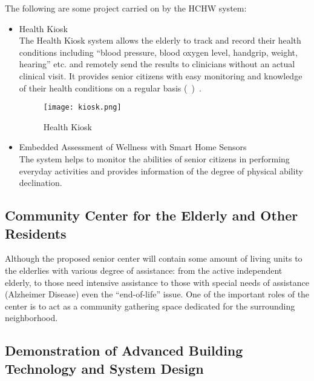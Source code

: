 The following are some project carried on by the HCHW system:
\begin{itemize}
\item Health Kiosk\\
  The Health Kiosk system allows the elderly to track and record their
  health conditions including ``blood pressure, blood oxygen level,
  handgrip, weight, hearing'' etc. and remotely send the results to
  clinicians without an actual clinical visit. It provides senior
  citizens with easy monitoring and knowledge of their health
  conditions on a regular basis (~)~\cite{Kiosk}.
 \begin{figure}[htbp]
   \centering
   \texttt{[image: kiosk.png]}
   \caption[Health Kiosk]{Health Kiosk~\cite{Kiosk}}
   \label{fig:kiosk}
\end{figure}
\item Embedded Assessment of Wellness with Smart Home Sensors\\
  The system helps to monitor the abilities of senior citizens in
  performing everyday activities and provides information of the
  degree of physical ability
  declination.~\cite{Lee:2010:EAW:1864431.1864490}
\end{itemize}

\subsection{Community Center for the Elderly and Other Residents}
Although the proposed senior center will contain some amount of living
units to the elderlies with various degree of assistance: from the
active independent elderly, to those need intensive assistance to
those with special needs of assistance (Alzheimer Disease) even the
``end-of-life'' issue. One of the important roles of the center is to
act as a community gathering space dedicated for the surrounding
neighborhood.

\subsection{Demonstration of Advanced Building Technology and System
  Design}

